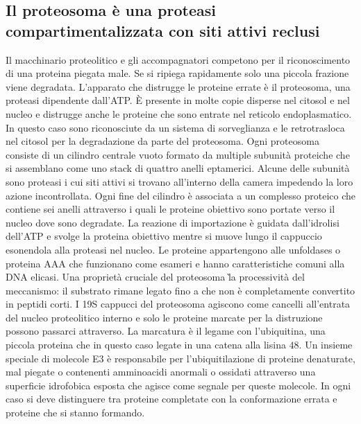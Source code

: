 \subsection{Il proteosoma \`e una proteasi compartimentalizzata con siti attivi reclusi}
Il macchinario proteolitico e gli accompagnatori competono per il riconoscimento di una proteina piegata male. Se si ripiega rapidamente solo una piccola frazione viene degradata. 
L'apparato che distrugge le proteine errate \`e il proteosoma, una proteasi dipendente dall'ATP. \`E presente in molte copie disperse nel citosol e nel nucleo e distrugge anche le 
proteine che sono entrate nel reticolo endoplasmatico. In questo caso sono riconosciute da un sistema di sorveglianza e le retrotrasloca nel citosol per la degradazione da parte del
proteosoma. Ogni proteosoma consiste di un cilindro centrale vuoto formato da multiple subunit\`a proteiche che si assemblano come uno stack di quattro anelli eptamerici. Alcune delle
subunit\`a sono proteasi i cui siti attivi si trovano all'interno della camera impedendo la loro azione incontrollata. Ogni fine del cilindro \`e associata a un complesso proteico che
contiene sei anelli attraverso i quali le proteine obiettivo sono portate verso il nucleo dove sono degradate. La reazione di importazione \`e guidata dall'idrolisi dell'ATP e svolge
la proteina obiettivo mentre si muove lungo il cappuccio esonendola alla proteasi nel nucleo. Le proteine appartengono alle unfoldases o proteina AAA che funzionano come esameri
e hanno caratteristiche comuni alla DNA elicasi. Una propriet\`a cruciale del proteosoma \` la processivit\`a del meccanismo: il substrato rimane legato fino a che non \`e completamente
convertito in peptidi corti. I 19S cappucci del proteosoma agiscono come cancelli all'entrata del nucleo proteolitico interno e solo le proteine marcate per la distruzione possono
passarci attraverso. La marcatura \`e il legame con l'ubiquitina, una piccola proteina che in questo caso legate in una catena alla lisina $48$. Un insieme speciale di molecole E3 \`e
responsabile per l'ubiquitilazione di proteine denaturate, mal piegate o contenenti amminoacidi anormali o ossidati attraverso una superficie idrofobica esposta che agisce come segnale
per queste molecole. In ogni caso si deve distinguere tra proteine completate con la conformazione errata e proteine che si stanno formando.

